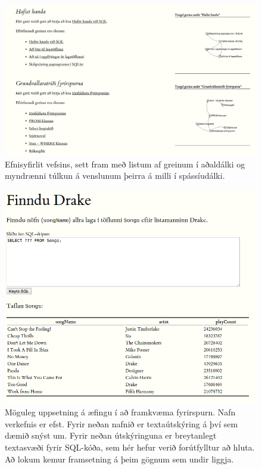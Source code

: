 \documentclass[a4paper,12pt,twoside,BCOR=10mm]{scrbook}
\begin{document}
\begin{figure}
\caption[Efnisyfirlit lesefnis vefsins]{Efnisyfirlit vefsins, sett fram með listum af greinum í aðaldálki og myndrænni túlkun á venslunum þeirra á milli í spássíudálki.}
\label{fig:section-overview}
\includegraphics[width=\textwidth]{mv-efnisyfirlit}
\end{figure}

\begin{figure}
\caption[Uppsetning verkefnis]{Möguleg uppsetning á æfingu í að framkvæma fyrirspurn. Nafn verkefnis er efst. Fyrir neðan nafnið er textaútskýring á því sem dæmið snýst um. Fyrir neðan útskýringuna er breytanlegt textasvæði fyrir SQL-kóða, sem hér hefur verið forútfylltur að hluta. Að lokum kemur framsetning á þeim gögnum sem undir liggja.}
\label{fig:example-exercise}
\includegraphics[width=\textwidth]{mv-verkefni-daemi}
\end{figure}
\end{document}
